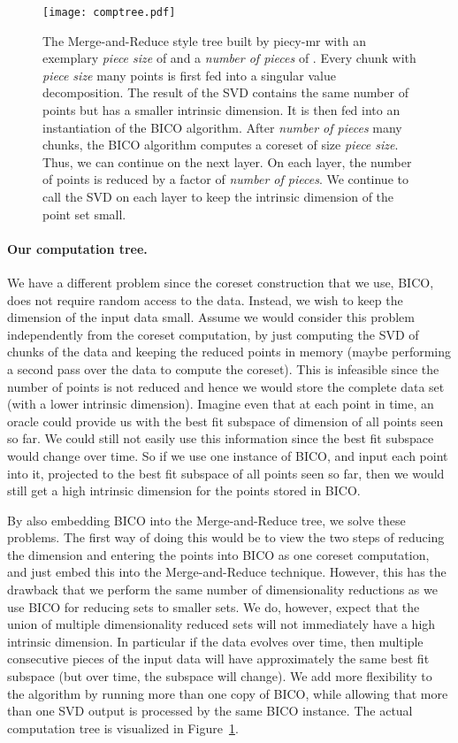\documentclass[a4paper]{scrartcl}
\begin{document}
\begin{figure}
\centering
\texttt{[image: comptree.pdf]}
\caption{\label{fig:piecy-mr-tree}The Merge-and-Reduce style tree built by piecy-mr
with an exemplary \emph{piece size} of  and a \emph{number of pieces} of .
Every chunk with \emph{piece size} many points is first fed into a singular value decomposition.
The result of the SVD contains the same number of points but has a smaller intrinsic dimension.
It is then fed into an instantiation of the BICO algorithm.
After \emph{number of pieces} many chunks, the BICO algorithm computes a coreset of size \emph{piece size}.
Thus, we can continue on the next layer. On each layer, the number of points is reduced by a
factor of \emph{number of pieces}. We continue to call the SVD on each layer to keep the intrinsic
dimension of the point set small.\label{fig:computationtreepiecymr}
}
\end{figure}

\paragraph*{Our computation tree.}
We have a different problem since the coreset construction that we use, BICO, does not require random access to the data. Instead, we wish to keep the dimension of the input data small. Assume we would consider this problem independently from the coreset computation, by just computing the SVD of chunks of the data and keeping the reduced points in memory (maybe performing a second pass over the data to compute the coreset). This is infeasible since the number of points is not reduced and hence we would store the complete data set (with a lower intrinsic dimension). Imagine even that at each point in time, an oracle could provide us with the best fit subspace of dimension  of all points seen so far. We could still not easily use this information since the best fit subspace would change over time. So if we use one instance of BICO, and input each point into it, projected to the best fit subspace of all points seen so far, then we would still get a high intrinsic dimension for the points stored in BICO.

By also embedding BICO into the Merge-and-Reduce tree, we solve these problems. The first way of doing this would be to view the two steps of reducing the dimension and entering the points into BICO as one coreset computation, and just embed this into the Merge-and-Reduce technique. However, this has the drawback that we perform the same number of dimensionality reductions as we use BICO for reducing sets to smaller sets. We do, however, expect that the union of multiple dimensionality reduced sets will not immediately have a high intrinsic dimension. In particular if the data evolves over time, then multiple consecutive  pieces of the input data will have approximately the same best fit subspace (but over time, the subspace will change). We add more flexibility to the algorithm by running more than one copy of BICO, while allowing that more than one SVD output is processed by the same BICO instance. The actual computation tree is visualized in Figure~\ref{fig:computationtreepiecymr}.
\end{document}
